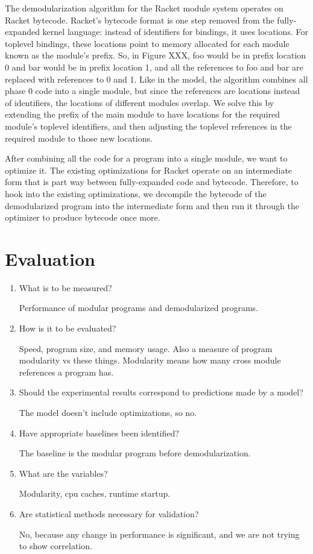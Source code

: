 \documentclass[preprint]{sigplanconf}
\begin{document}
The demodularization algorithm for the Racket module system operates on Racket bytecode. 
Racket's bytecode format is one step removed from the fully-expanded kernel language: instead of identifiers for bindings, it uses locations.
For toplevel bindings, these locations point to memory allocated for each module known as the module's prefix.
So, in Figure XXX, foo would be in prefix location 0 and bar would be in prefix location 1, and all the references to foo and bar are replaced with references to 0 and 1.
Like in the model, the algorithm combines all phase 0 code into a single module, but since the references are locations instead of identifiers, the locations of different modules overlap.
We solve this by extending the prefix of the main module to have locations for the required module's toplevel identifiers, and then adjusting the toplevel references in the required module to those new locations. 

After combining all the code for a program into a single module, we want to optimize it.
The existing optimizations for Racket operate on an intermediate form that is part way between fully-expanded code and bytecode. 
Therefore, to hook into the existing optimizations, we decompile the bytecode of the demodularized program into the intermediate form and then run it through the optimizer to produce bytecode once more.

\section{Evaluation}
   \begin{enumerate} 
   \item What is to be measured?
   
   Performance of modular programs and demodularized programs.
  
   \item How is it to be evaluated?
   
   Speed, program size, and memory usage. Also a measure of program modularity vs these things. Modularity means how many cross module references a program has.

   \item Should the experimental results correspond to predictions made by a model?
 
   The model doesn't include optimizations, so no.

   \item Have appropriate baselines been identified?

   The baseline is the modular program before demodularization.

   \item What are the variables?

   Modularity, cpu caches, runtime startup.

   \item Are statistical methods necessary for validation?

   No, because any change in performance is significant, and we are not trying to show correlation.

   \end{enumerate}
\end{document}
